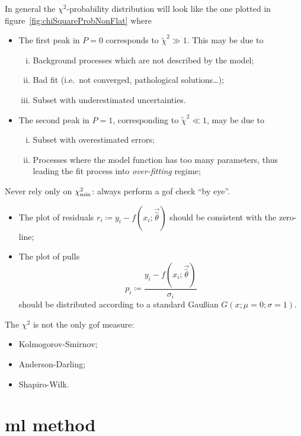 In general the $\chi^2$-probability distribution will look like the one plotted in figure~\ref{fig:chiSquareProbNonFlat} where
\begin{itemize}
	\item
		The first peak in $P = 0$ corresponds to $\tilde\chi^2\gg1$.
		This may be due to
		\begin{enumerate}[i)]
			\item
				Background processes which are not described by the model;
			\item
				Bad fit (i.e.~not converged, pathological solutions\dots);
			\item
				Subset with underestimated uncertainties.
		\end{enumerate}
	\item
		The second peak in $P=1$, corresponding to $\tilde\chi^2\ll1$, may be due to
		\begin{enumerate}[i)]
			\item
				Subset with overestimated errors;
			\item
				Processes where the model function has too many parameters, thus leading the fit process into \emph{over-fitting} regime;
		\end{enumerate}
\end{itemize}



Never rely only on $\chi^2_\textup{min}$: always perform a \ac{gof} check ``by eye''.
\begin{itemize}
	\item
		The plot of residuals $r_i \coloneqq y_i - f(x_i;\vec{\hat\theta})$ should be consistent with the zero-line;
	\item
		The plot of pulls
		\begin{equation}
			p_i \coloneqq \frac{y_i - f(x_i;\vec{\hat\theta})}{\sigma_i}
		\end{equation}
		should be distributed according to a standard Gau\ss{}ian $G(x;\mu=0;\sigma = 1)$.
\end{itemize}



The $\chi^2$ is not the only \ac{gof} measure:
\begin{itemize}
	\item
		Kolmogorov-Smirnov;
	\item
		Anderson-Darling;
	\item
		Shapiro-Wilk.
\end{itemize}

\section{\acl{ml} method}

